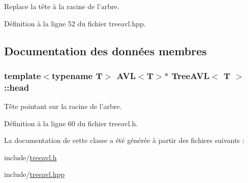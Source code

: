Replace la tête à la racine de l'arbre. 



Définition à la ligne 52 du fichier treeavl.\-hpp.



\subsection{Documentation des données membres}
\hypertarget{class_tree_a_v_l_a7d77c489adc9149acc336c101086ca24}{
\subsubsection[{head}]{\setlength{\rightskip}{0pt plus 5cm}template$<$typename T$>$ {\bf A\-V\-L}$<$T$>$$\ast$ {\bf Tree\-A\-V\-L}$<$ T $>$\-::head\hspace{0.3cm}{\ttfamily [private]}}}\label{class_tree_a_v_l_a7d77c489adc9149acc336c101086ca24}


Tête pointant sur la racine de l'arbre. 



Définition à la ligne 60 du fichier treeavl.\-h.



La documentation de cette classe a été générée à partir des fichiers suivants \-:\begin{DoxyCompactItemize}
\item 
include/\hyperlink{treeavl_8h}{treeavl.\-h}\item 
include/\hyperlink{treeavl_8hpp}{treeavl.\-hpp}\end{DoxyCompactItemize}

